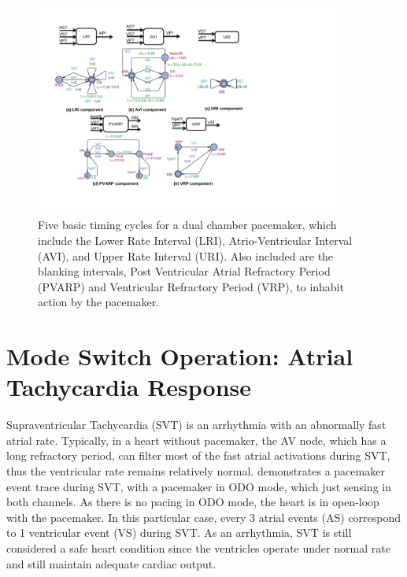 \begin{figure}[!t]
\center
\includegraphics[width=0.9\textwidth]{figs/pacemaker.pdf}
\caption{Five basic timing cycles for a dual chamber pacemaker, which include the Lower Rate Interval (LRI), Atrio-Ventricular Interval (AVI), and Upper Rate Interval (URI). Also included are the blanking intervals, Post Ventricular Atrial Refractory Period (PVARP) and Ventricular Refractory Period (VRP), to inhabit action by the pacemaker.}
\label{fig:PMdesign}
\end{figure} 

\section{Mode Switch Operation: Atrial Tachycardia Response}
\label{Mode_switch}
Supraventricular Tachycardia (SVT) is an arrhythmia with an abnormally fast atrial rate. %
Typically, in a heart without pacemaker, the AV node, which has a long refractory period, can filter most of the fast atrial activations during SVT, thus the ventricular rate remains relatively normal.  demonstrates a pacemaker event trace during SVT, with a pacemaker in ODO mode, which just sensing in both channels. 
As there is no pacing in ODO mode, the heart is in open-loop with the pacemaker. In this particular case, every 3 atrial events (AS) correspond to 1 ventricular event (VS) during SVT. 
As an arrhythmia, SVT is still considered a safe heart condition since the ventricles operate under normal rate and still maintain adequate cardiac output. 

